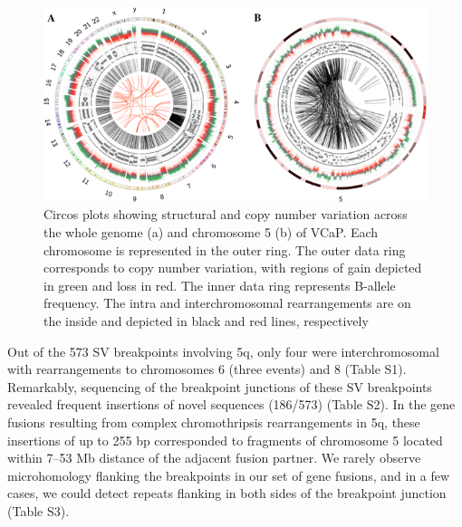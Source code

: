 \begin{figure}
    \includegraphics[width=\textwidth]{chapters/images/vcap/circosplots.png}
    \caption{Circos plots showing structural and copy number variation across the whole genome (a) and chromosome 5 (b) of VCaP. Each chromosome is represented in the outer ring. The outer data ring corresponds to copy number variation, with regions of gain depicted in green and loss in red. The inner data ring represents B-allele frequency. The intra and interchromosomal rearrangements are on the inside and depicted in black and red lines, respectively}
    \label{fig:vcap-circos}
\end{figure}


Out of the 573 SV breakpoints involving 5q, only four were interchromosomal with rearrangements to chromosomes 6 (three events) and 8 (Table S1). Remarkably, sequencing of the breakpoint junctions of these SV breakpoints revealed frequent insertions of novel sequences (186/573) (Table S2). In the gene fusions resulting from complex chromothripsis rearrangements in 5q, these insertions of up to 255 bp corresponded to fragments of chromosome 5 located within 7–53 Mb distance of the adjacent fusion partner. We rarely observe microhomology flanking the breakpoints in our set of gene fusions, and in a few cases, we could detect repeats flanking in both sides of the breakpoint junction (Table S3).


